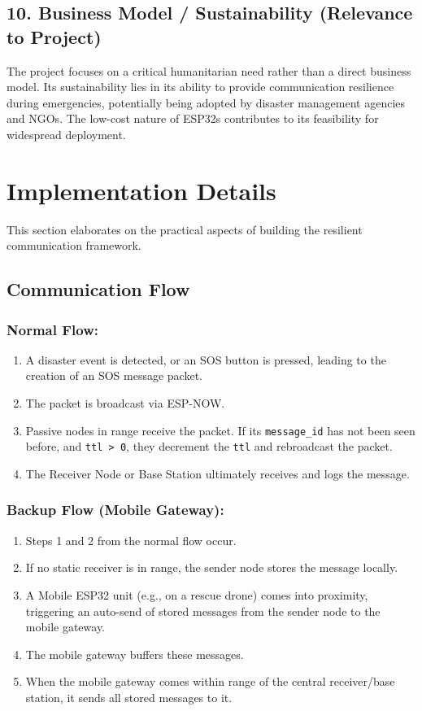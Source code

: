 \documentclass[12pt, a4paper]{article}
\begin{document}
\subsection{10. Business Model / Sustainability (Relevance to Project)}
The project focuses on a critical humanitarian need rather than a direct business model. Its sustainability lies in its ability to provide communication resilience during emergencies, potentially being adopted by disaster management agencies and NGOs. The low-cost nature of ESP32s contributes to its feasibility for widespread deployment.

\section{Implementation Details}
This section elaborates on the practical aspects of building the resilient communication framework.

\subsection{Communication Flow}
\subsubsection{Normal Flow:}
\begin{enumerate}
    \item A disaster event is detected, or an SOS button is pressed, leading to the creation of an SOS message packet.
    \item The packet is broadcast via ESP-NOW.
    \item Passive nodes in range receive the packet. If its \texttt{message\_id} has not been seen before, and \texttt{ttl > 0}, they decrement the \texttt{ttl} and rebroadcast the packet.
    \item The Receiver Node or Base Station ultimately receives and logs the message.
\end{enumerate}

\subsubsection{Backup Flow (Mobile Gateway):}
\begin{enumerate}
    \item Steps 1 and 2 from the normal flow occur.
    \item If no static receiver is in range, the sender node stores the message locally.
    \item A Mobile ESP32 unit (e.g., on a rescue drone) comes into proximity, triggering an auto-send of stored messages from the sender node to the mobile gateway.
    \item The mobile gateway buffers these messages.
    \item When the mobile gateway comes within range of the central receiver/base station, it sends all stored messages to it.
\end{enumerate}
\end{document}

